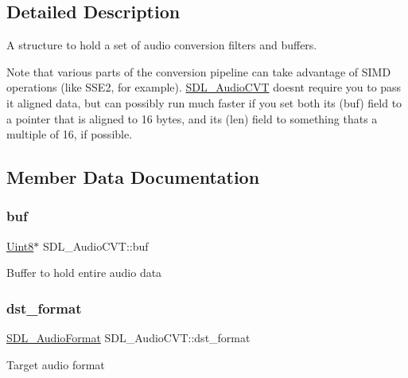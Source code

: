 \subsection{Detailed Description}
A structure to hold a set of audio conversion filters and buffers. 

Note that various parts of the conversion pipeline can take advantage of S\+I\+MD operations (like S\+S\+E2, for example). \hyperlink{struct_s_d_l___audio_c_v_t}{S\+D\+L\+\_\+\+Audio\+C\+VT} doesn\textquotesingle{}t require you to pass it aligned data, but can possibly run much faster if you set both its (buf) field to a pointer that is aligned to 16 bytes, and its (len) field to something that\textquotesingle{}s a multiple of 16, if possible. 

\subsection{Member Data Documentation}
\mbox{\label{struct_s_d_l___audio_c_v_t_a080db27b929efa983c5161360ffce310}} 
\subsubsection{\texorpdfstring{buf}{buf}}
{\footnotesize\ttfamily \hyperlink{_s_d_l__stdinc_8h_a2944638813a090aa23e62f4da842c3e2}{Uint8}$\ast$ S\+D\+L\+\_\+\+Audio\+C\+V\+T\+::buf}

Buffer to hold entire audio data \mbox{\label{struct_s_d_l___audio_c_v_t_a8f890d017be857a3b048bf00525736c6}} 
\subsubsection{\texorpdfstring{dst\+\_\+format}{dst\_format}}
{\footnotesize\ttfamily \hyperlink{_s_d_l__audio_8h_a491ed103fd25d920c4e6b7495217ce66}{S\+D\+L\+\_\+\+Audio\+Format} S\+D\+L\+\_\+\+Audio\+C\+V\+T\+::dst\+\_\+format}

Target audio format \mbox{\label{struct_s_d_l___audio_c_v_t_a35093b3ad3331c17416c593a76012b63}} 
